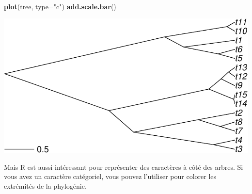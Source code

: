 \documentclass[
]{book}
\newenvironment{Shaded}{\begin{snugshade}}{\end{snugshade}}
\newcommand{\AttributeTok}[1]{\textcolor[rgb]{0.13,0.29,0.53}{#1}}
\newcommand{\FunctionTok}[1]{\textcolor[rgb]{0.13,0.29,0.53}{\textbf{#1}}}
\newcommand{\NormalTok}[1]{#1}
\newcommand{\StringTok}[1]{\textcolor[rgb]{0.31,0.60,0.02}{#1}}
\begin{document}
\begin{Shaded}
\begin{Highlighting}[]
\FunctionTok{plot}\NormalTok{(tree, }\AttributeTok{type=}\StringTok{"c"}\NormalTok{)}
\FunctionTok{add.scale.bar}\NormalTok{()}
\end{Highlighting}
\end{Shaded}

\includegraphics{pcm-workshop_files/figure-latex/Basic tree plotting-1.pdf}

Mais R est aussi intéressant pour représenter des caractères à côté des arbres. Si vous avez un caractère catégoriel, vous pouvez l'utiliser pour colorer les extrémités de la phylogénie.
\end{document}
